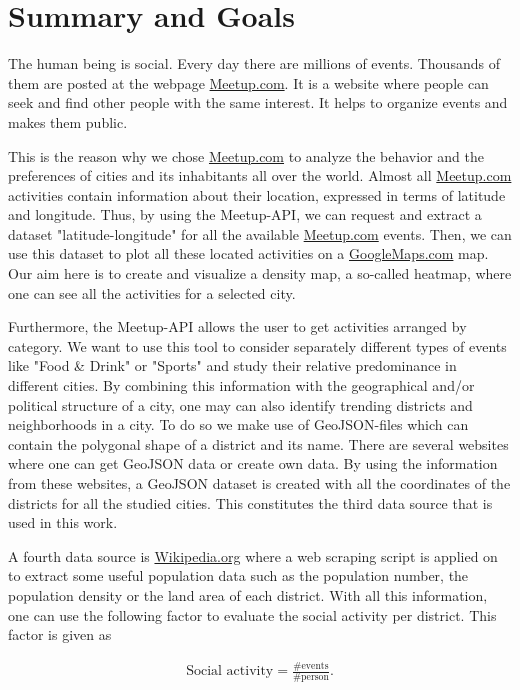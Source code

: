 \section{Summary and Goals}\label{sec:summaryandgoals}

The human being is social. Every day there are millions of events. Thousands of them are posted at the webpage \url{Meetup.com}. It is a website where people can seek and find other people with the same interest. It helps to organize events and makes them public.

This is the reason why we chose \url{Meetup.com} to analyze the behavior and the preferences of cities and its inhabitants all over the world. Almost all \url{Meetup.com} activities contain information about their location, expressed in terms of latitude and longitude. Thus, by using the Meetup-API, we can request and extract a dataset "latitude-longitude" for all the available \url{Meetup.com} events. Then, we can use this dataset to plot all these located activities on a \url{GoogleMaps.com} map. Our aim here is to create and visualize a density map, a so-called heatmap, where one can see all the activities for a selected city.

Furthermore, the Meetup-API allows the user to get activities arranged by category. We want to use this tool to consider separately different types of events like "Food \& Drink" or "Sports" and study their relative predominance in different cities. By combining this information with the geographical and/or political structure of a city, one may can also identify trending districts and neighborhoods in a city. To do so we make use of GeoJSON-files which can contain the polygonal shape of a district and its name. There are several websites where one can get GeoJSON data or create own data. By using the information from these websites, a GeoJSON dataset is created with all the coordinates of the districts for all the studied cities. This constitutes the third data source that is used in this work.

A fourth data source is \url{Wikipedia.org} where a web scraping script is applied on to extract some useful population data such as the population number, the population density or the land area of each district. With all this information, one can use the following factor to evaluate the social activity per district. This factor is given as

\begin{align*}
	\text{Social activity} = \frac{\text{\# events}}{\text{\# person}}.
\end{align*}

